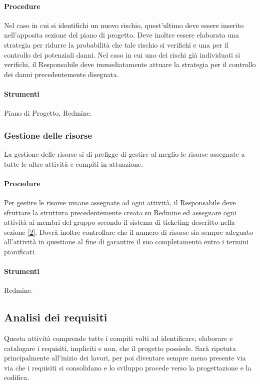 \paragraph{Procedure}
Nel caso in cui si identifichi un nuovo rischio, quest'ultimo deve essere inserito nell'apposita sezione del piano di progetto. Deve inoltre essere elaborata una strategia per ridurre la probabilità che tale rischio si verifichi e una per il controllo dei potenziali danni.
Nel caso in cui uno dei rischi già individuati si verifichi, il Responsabile deve immediatamente attuare la strategia per il controllo dei danni precedentemente disegnata.

\paragraph{Strumenti}
Piano di Progetto, Redmine.


\subsubsection{Gestione delle risorse}
La gestione delle risorse si di prefigge di gestire al meglio le risorse assegnate a tutte le altre attività e compiti in attuazione.
\paragraph{Procedure}
Per gestire le risorse umane assegnate ad ogni attività, il Responsabile deve sfruttare la struttura precedentemente creata su Redmine ed assegnare ogni attività ai membri del gruppo secondo il sistema di ticketing descritto nella sezione \ref{2}.
Dovrà inoltre controllare che il numero di risorse sia sempre adeguato all'attività in questione al fine di garantire il suo completamento entro i termini pianificati.

\paragraph{Strumenti}
Redmine.

\subsection{Analisi dei requisiti}
\label{processo_analisi}
Questa attività comprende tutte i compiti volti ad identificare, elaborare e catalogare i requisiti, impliciti e non, che il progetto possiede.
Sarà ripetuta principalmente all'inizio dei lavori, per poi diventare sempre meno presente via via che i requisiti si consolidano e lo sviluppo procede verso la progettazione e la codifica.


